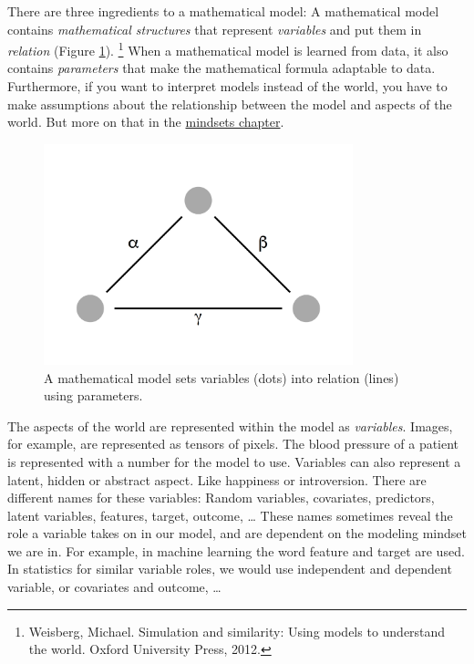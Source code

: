 \documentclass[
  10pt,
]{scrbook}
\begin{document}
There are three ingredients to a mathematical model:
A mathematical model contains \emph{mathematical structures} that represent \emph{variables} and put them in \emph{relation} (Figure \ref{fig:model}). \footnote{Weisberg, Michael. Simulation and similarity: Using models to understand the world. Oxford University Press, 2012.}
When a mathematical model is learned from data, it also contains \emph{parameters} that make the mathematical formula adaptable to data.
Furthermore, if you want to interpret models instead of the world, you have to make assumptions about the relationship between the model and aspects of the world.
But more on that in the \protect\hyperlink{mindsets}{mindsets chapter}.

\begin{figure}

{\centering \includegraphics[width=0.8\textwidth]{figures/model-1} 

}

\caption{A mathematical model sets variables (dots) into relation (lines) using parameters.}\label{fig:model}
\end{figure}

The aspects of the world are represented within the model as \emph{variables}.
Images, for example, are represented as tensors of pixels.
The blood pressure of a patient is represented with a number for the model to use.
Variables can also represent a latent, hidden or abstract aspect.
Like happiness or introversion.
There are different names for these variables:
Random variables, covariates, predictors, latent variables, features, target, outcome, \ldots{}
These names sometimes reveal the role a variable takes on in our model, and are dependent on the modeling mindset we are in.
For example, in machine learning the word feature and target are used.
In statistics for similar variable roles, we would use independent and dependent variable, or covariates and outcome, \ldots{}
\end{document}
